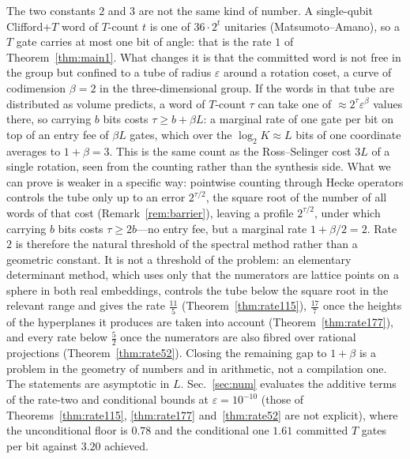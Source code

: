\documentclass[aps,prx,twocolumn,superscriptaddress,nofootinbib,longbibliography]{revtex4-2}
\theoremstyle{plain}
\theoremstyle{definition}
\theoremstyle{remark}
\begin{document}
The two constants $2$ and $3$ are not the same kind of number. A single-qubit Clifford+$T$ word of $T$-count $t$ is one of $36\cdot2^t$ unitaries (Matsumoto--Amano), so a $T$ gate carries at most one bit of angle: that is the rate $1$ of Theorem~\ref{thm:main1}. What changes it is that the committed word is not free in the group but confined to a tube of radius $\varepsilon$ around a rotation coset, a curve of codimension $\beta=2$ in the three-dimensional group. If the words in that tube are distributed as volume predicts, a word of $T$-count $\tau$ can take one of $\approx2^{\tau}\varepsilon^{\beta}$ values there, so carrying $b$ bits costs $\tau\ge b+\beta L$: a marginal rate of one gate per bit on top of an entry fee of $\beta L$ gates, which over the $\log_2K\approx L$ bits of one coordinate averages to $1+\beta=3$. This is the same count as the Ross--Selinger cost $3L$ of a single rotation, seen from the counting rather than the synthesis side. What we can prove is weaker in a specific way: pointwise counting through Hecke operators controls the tube only up to an error $2^{\tau/2}$, the square root of the number of all words of that cost (Remark~\ref{rem:barrier}), leaving a profile $2^{\tau/2}$, under which carrying $b$ bits costs $\tau\ge2b$---no entry fee, but a marginal rate $1+\beta/2=2$. Rate $2$ is therefore the natural threshold of the spectral method rather than a geometric constant. It is not a threshold of the problem: an elementary determinant method, which uses only that the numerators are lattice points on a sphere in both real embeddings, controls the tube below the square root in the relevant range and gives the rate $\tfrac{11}5$ (Theorem~\ref{thm:rate115}), $\tfrac{17}7$ once the heights of the hyperplanes it produces are taken into account (Theorem~\ref{thm:rate177}), and every rate below $\tfrac52$ once the numerators are also fibred over rational projections (Theorem~\ref{thm:rate52}). Closing the remaining gap to $1+\beta$ is a problem in the geometry of numbers and in arithmetic, not a compilation one. The statements are asymptotic in $L$. Sec.~\ref{sec:num} evaluates the additive terms of the rate-two and conditional bounds at $\varepsilon=10^{-10}$ (those of Theorems~\ref{thm:rate115}, \ref{thm:rate177} and~\ref{thm:rate52} are not explicit), where the unconditional floor is $0.78$ and the conditional one $1.61$ committed $T$ gates per bit against $3.20$ achieved.
\end{document}

